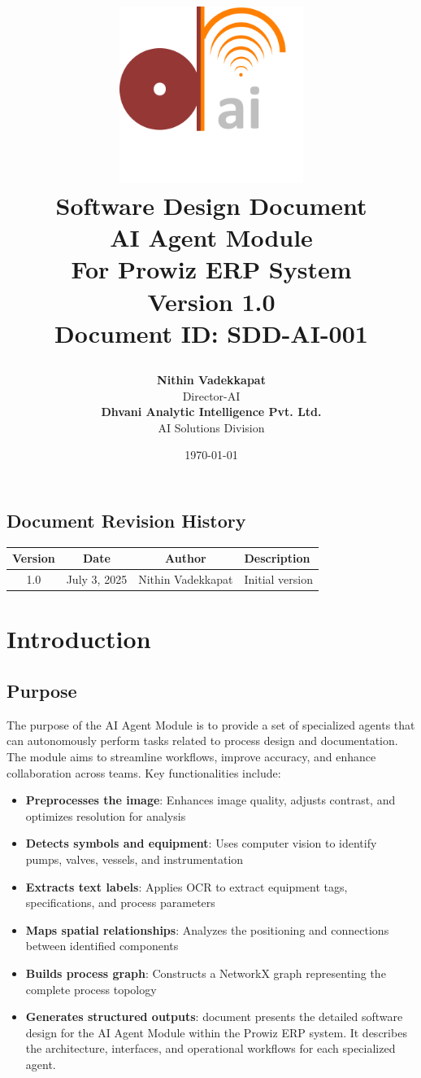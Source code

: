 \documentclass[12pt]{report}
\title{
  \vspace{-2cm}
  \begin{center}
    \includegraphics[width=6cm]{../../pics/logo.png}\\[2cm]
    {\Huge \textbf{Software Design Document}}\\[0.5cm]
    {\Large AI Agent Module}\\[1cm]
    {\large For Prowiz ERP System}\\[1.5cm]
    {\normalsize \textbf{Version 1.0}}\\[0.5cm]
    {\small Document ID: SDD-AI-001}
  \end{center}
}
\author{
  \textbf{Nithin Vadekkapat}\\
  Director-AI\\[0.5cm]
  \textbf{Dhvani Analytic Intelligence Pvt. Ltd.}\\
  AI Solutions Division
}
\date{\today}
\begin{document}
\thispagestyle{empty}
\maketitle
\newpage

\thispagestyle{empty}
\section*{Document Revision History}
\begin{table}[h]
\centering
\begin{tabular}{|c|c|c|l|}
\hline
\textbf{Version} & \textbf{Date} & \textbf{Author} & \textbf{Description} \\
\hline
1.0 & July 3, 2025 & Nithin Vadekkapat & Initial version \\
\hline
\end{tabular}
\end{table}
\vfill
\newpage

\thispagestyle{empty}
\tableofcontents
\clearpage

\pagestyle{fancy}

\chapter{Introduction}
\section{Purpose}
The purpose of the AI Agent Module is to provide a set of specialized agents that can autonomously perform tasks related to process design and documentation. The module aims to streamline workflows, improve accuracy, and enhance collaboration across teams. Key functionalities include:
\begin{itemize}
  \item \textbf{Preprocesses the image}: Enhances image quality, adjusts contrast, and optimizes resolution for analysis
  \item \textbf{Detects symbols and equipment}: Uses computer vision to identify pumps, valves, vessels, and instrumentation
  \item \textbf{Extracts text labels}: Applies OCR to extract equipment tags, specifications, and process parameters
  \item \textbf{Maps spatial relationships}: Analyzes the positioning and connections between identified components
  \item \textbf{Builds process graph}: Constructs a NetworkX graph representing the complete process topology
  \item \textbf{Generates structured outputs}: document presents the detailed software design for the AI Agent Module within the Prowiz ERP system. It describes the architecture, interfaces, and operational workflows for each specialized agent.
\end{itemize}
\end{document}
